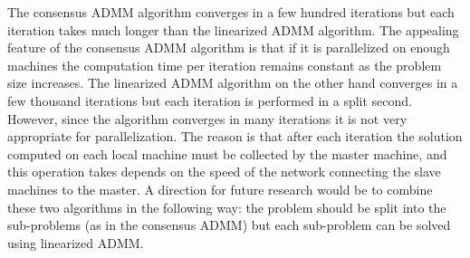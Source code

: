 \documentclass[letterpaper]{article} %
\newcommand{\attn}[1]{\textcolor{red}{TODO: #1}}
\begin{document}
The consensus ADMM algorithm converges in a few hundred iterations
but each iteration takes much longer than the linearized ADMM
algorithm. The appealing feature of the consensus ADMM algorithm is
that if it is parallelized on enough machines the
computation time per iteration remains constant as the problem size
increases. The linearized ADMM algorithm on the other hand converges
in a few thousand iterations but each iteration is performed in a
split second. However, since the algorithm converges in many
iterations it is not very appropriate for parallelization. The reason
is that after each iteration the solution computed on each local machine
must be collected by the master machine, and this operation takes
depends on the speed of the network connecting the
slave machines to the master. A direction for future research would be
to combine these two algorithms in the following way: the problem
should be split into the sub-problems (as in the consensus ADMM) but
each sub-problem can be solved using linearized ADMM. 



\fontsize{9.0pt}{10.0pt} \selectfont


\end{document}
